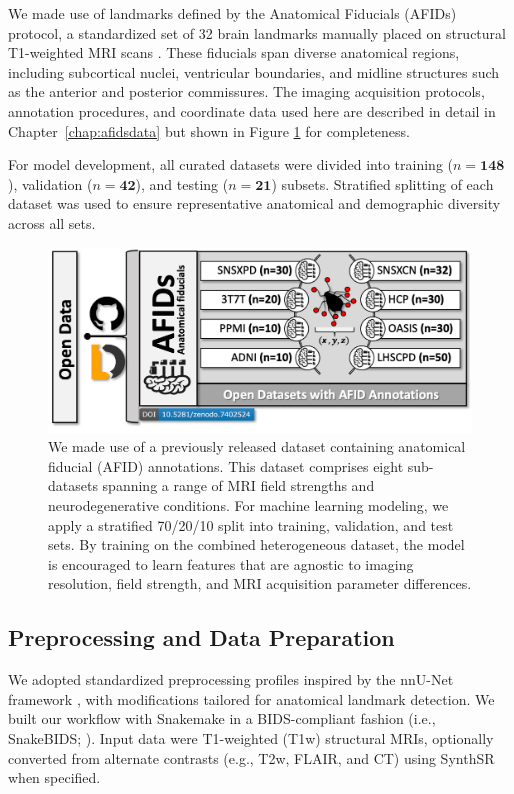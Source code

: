 We made use of landmarks defined by the Anatomical Fiducials (AFIDs) protocol, a standardized set of 32 brain landmarks manually placed on structural T1-weighted MRI scans \cite{Lau2019-eh}. These fiducials span diverse anatomical regions, including subcortical nuclei, ventricular boundaries, and midline structures such as the anterior and posterior commissures. The imaging acquisition protocols, annotation procedures, and coordinate data used here are described in detail in Chapter~\ref{chap:afidsdata} but shown in Figure \ref{fig:ch3_Figure_data} for completeness.

For model development, all curated datasets were divided into training ($n = \textbf{148}$), validation ($n = \textbf{42}$), and testing ($n = \textbf{21}$) subsets. Stratified splitting of each dataset was used to ensure representative anatomical and demographic diversity across all sets.

\begin{figure}[hbt!]
    \centering
    \includegraphics[width=1\linewidth]{figs/ch3_Figure_data.png}
    \caption{We made use of a previously released dataset containing anatomical fiducial (AFID) annotations. This dataset comprises eight sub-datasets spanning a range of MRI field strengths and neurodegenerative conditions. For machine learning modeling, we apply a stratified 70/20/10 split into training, validation, and test sets. By training on the combined heterogeneous dataset, the model is encouraged to learn features that are agnostic to imaging resolution, field strength, and MRI acquisition parameter differences.}
    \label{fig:ch3_Figure_data}
\end{figure}

\subsection{Preprocessing and Data Preparation}

We adopted standardized preprocessing profiles inspired by the nnU-Net framework \cite{Isensee2021-ev}, with modifications tailored for anatomical landmark detection. We built our workflow with Snakemake \cite{Koster2012-ok} in a BIDS-compliant fashion (i.e., SnakeBIDS; \cite{Van-Dyken2025-cn}). Input data were T1-weighted (T1w) structural MRIs, optionally converted from alternate contrasts (e.g., T2w, FLAIR, and CT) using SynthSR \cite{Iglesias2023-co} when specified. 

